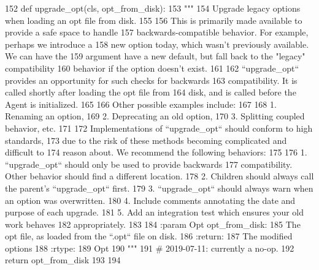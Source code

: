 \begin{DoxyCode}
152     \textcolor{keyword}{def }upgrade\_opt(cls, opt\_from\_disk):
153         \textcolor{stringliteral}{"""}
154 \textcolor{stringliteral}{        Upgrade legacy options when loading an opt file from disk.}
155 \textcolor{stringliteral}{}
156 \textcolor{stringliteral}{        This is primarily made available to provide a safe space to handle}
157 \textcolor{stringliteral}{        backwards-compatible behavior. For example, perhaps we introduce a}
158 \textcolor{stringliteral}{        new option today, which wasn't previously available. We can have the}
159 \textcolor{stringliteral}{        argument have a new default, but fall back to the "legacy" compatibility}
160 \textcolor{stringliteral}{        behavior if the option doesn't exist.}
161 \textcolor{stringliteral}{}
162 \textcolor{stringliteral}{        ``upgrade\_opt`` provides an opportunity for such checks for backwards}
163 \textcolor{stringliteral}{        compatibility. It is called shortly after loading the opt file from}
164 \textcolor{stringliteral}{        disk, and is called before the Agent is initialized.}
165 \textcolor{stringliteral}{}
166 \textcolor{stringliteral}{        Other possible examples include:}
167 \textcolor{stringliteral}{}
168 \textcolor{stringliteral}{            1. Renaming an option,}
169 \textcolor{stringliteral}{            2. Deprecating an old option,}
170 \textcolor{stringliteral}{            3. Splitting coupled behavior, etc.}
171 \textcolor{stringliteral}{}
172 \textcolor{stringliteral}{        Implementations of ``upgrade\_opt`` should conform to high standards,}
173 \textcolor{stringliteral}{        due to the risk of these methods becoming complicated and difficult to}
174 \textcolor{stringliteral}{        reason about. We recommend the following behaviors:}
175 \textcolor{stringliteral}{}
176 \textcolor{stringliteral}{            1. ``upgrade\_opt`` should only be used to provide backwards}
177 \textcolor{stringliteral}{            compatibility.  Other behavior should find a different location.}
178 \textcolor{stringliteral}{            2. Children should always call the parent's ``upgrade\_opt`` first.}
179 \textcolor{stringliteral}{            3. ``upgrade\_opt`` should always warn when an option was overwritten.}
180 \textcolor{stringliteral}{            4. Include comments annotating the date and purpose of each upgrade.}
181 \textcolor{stringliteral}{            5. Add an integration test which ensures your old work behaves}
182 \textcolor{stringliteral}{            appropriately.}
183 \textcolor{stringliteral}{}
184 \textcolor{stringliteral}{        :param Opt opt\_from\_disk:}
185 \textcolor{stringliteral}{            The opt file, as loaded from the ``.opt`` file on disk.}
186 \textcolor{stringliteral}{        :return:}
187 \textcolor{stringliteral}{            The modified options}
188 \textcolor{stringliteral}{        :rtype:}
189 \textcolor{stringliteral}{            Opt}
190 \textcolor{stringliteral}{        """}
191         \textcolor{comment}{# 2019-07-11: currently a no-op.}
192         \textcolor{keywordflow}{return} opt\_from\_disk
193 
194 
\end{DoxyCode}


